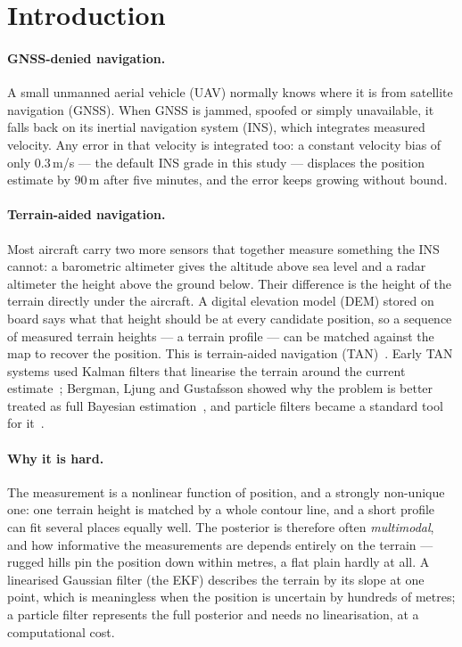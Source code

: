 \section{Introduction}\label{sec:intro}

\paragraph{GNSS-denied navigation.} A small unmanned aerial vehicle (UAV) normally knows where it
is from satellite navigation (GNSS). When GNSS is jammed, spoofed or simply unavailable, it falls
back on its inertial navigation system (INS), which integrates measured velocity. Any error in
that velocity is integrated too: a constant velocity bias of only $0.3$\,m/s --- the default
INS grade in this study --- displaces the position estimate by $90$\,m after five minutes, and
the error keeps growing without bound.

\paragraph{Terrain-aided navigation.} Most aircraft carry two more sensors that together
measure something the INS cannot: a barometric altimeter gives the altitude above sea level and a
radar altimeter the height above the ground below. Their difference is the height of the terrain
directly under the aircraft. A digital elevation model (DEM) stored on board says what that height
should be at every candidate position, so a sequence of measured terrain heights --- a terrain
profile --- can be matched against the map to recover the position. This is terrain-aided
navigation (TAN)~\cite{bergman1999csm}. Early TAN systems used Kalman filters that linearise the
terrain around the current estimate~\cite{hostetler1983}; Bergman, Ljung and Gustafsson showed why
the problem is better treated as full Bayesian estimation~\cite{bergman1999csm,bergman1999thesis},
and particle filters became a standard tool for it~\cite{gustafsson2002,gustafsson2010}.

\paragraph{Why it is hard.} The measurement is a nonlinear function of position, and a strongly
non-unique one: one terrain height is matched by a whole contour line, and a short profile can
fit several places equally well. The posterior is therefore often \emph{multimodal}, and how
informative the measurements are depends entirely on the terrain --- rugged hills pin the position
down within metres, a flat plain hardly at all. A linearised Gaussian filter (the EKF) describes
the terrain by its slope at one point, which is meaningless when the position is uncertain by
hundreds of metres; a particle filter represents the full posterior and needs no linearisation,
at a computational cost.

